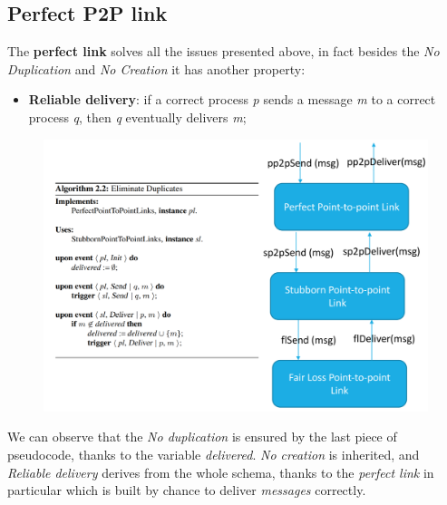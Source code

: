 \documentclass{article}
\begin{document}
\subsection{Perfect P2P link}
The \textbf{perfect link} solves all the issues presented above, in fact besides the \emph{No Duplication} and \emph{No Creation} it has another property:
\begin{itemize}
\item \textbf{Reliable delivery}: if a correct process \emph{p} sends a message \emph{m} to a correct process \emph{q}, then \emph{q} eventually delivers \emph{m};
\end{itemize}
\begin{figure}[H]
  \centering
  \includegraphics[scale=0.5, left]{cattura11.png}
\end{figure}
We can observe that the \emph{No duplication} is ensured by the last piece of pseudocode, thanks to the variable \emph{delivered}. \emph{No creation} is inherited, and \emph{Reliable delivery} derives from the whole schema, thanks to the \emph{perfect link} in particular which is built by chance to deliver \emph{messages} correctly. 
\clearpage
\end{document}
